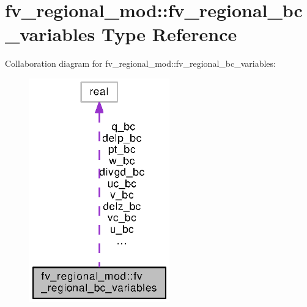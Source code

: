 \section{fv\-\_\-regional\-\_\-mod\-:\-:fv\-\_\-regional\-\_\-bc\-\_\-variables Type Reference}
\label{structfv__regional__mod_1_1fv__regional__bc__variables}


Collaboration diagram for fv\-\_\-regional\-\_\-mod\-:\-:fv\-\_\-regional\-\_\-bc\-\_\-variables\-:
\nopagebreak
\begin{figure}[H]
\begin{center}
\leavevmode
\includegraphics[width=172pt]{structfv__regional__mod_1_1fv__regional__bc__variables__coll__graph}
\end{center}
\end{figure}
